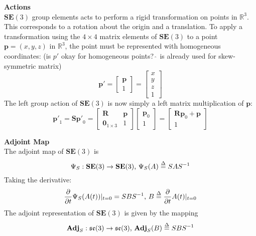 		\textbf{Actions}\\
		$\mathbf{SE}(3)$ group elements acts to perform a rigid transformation on points in $\mathbb{R}^3$. This corresponds to a rotation about the origin and a translation.
		To apply a transformation using the $4 \times 4$ matrix elements of $\mathbf{SE}(3)$ to a point $\textbf{p} = (x,y,z) $ in $\mathbb{R}^3$, the point must be represented with homogeneous coordinates: (is $p'$ okay for homogeneous points? $\hat{\:}$ is already used for skew-symmetric matrix)
		\begin{equation}
			\mathbf{p'} = 
			\begin{bmatrix}
				  \mathbf{p} \\
				  1	
			\end{bmatrix} =
			\begin{bmatrix}
				  x	\\
				  y	\\
				  z	\\
				  1	
			\end{bmatrix}
		\end{equation}
		The left group action of $\mathbf{SE}(3)$ is now simply a left matrix multiplication of $\mathbf{p}$:
		\begin{equation}
			\mathbf{p'}_1 = \mathbf{S}\mathbf{p'}_0 = 
			\begin{bmatrix}
				\mathbf{R}	&	\mathbf{p} \\
				\textbf{0}_{1 \times 3}		& 	1 					 				  
			\end{bmatrix}
			\begin{bmatrix}
				\mathbf{p}_0 \\
				1	
			\end{bmatrix}
			=
			\begin{bmatrix}
				\mathbf{R}\mathbf{p}_0 + \mathbf{p}\\
				1	
			\end{bmatrix}
		\end{equation}
				
		\textbf{Adjoint Map}\\
		The adjoint map of $\mathbf{SE}(3)$ is
		\begin{equation}
			\Psi_S: \mathbf{SE}(3) \rightarrow \mathbf{SE}(3) \textnormal{, }
			\Psi_S(A) \stackrel{\Delta}{=} SAS^{-1}
		\end{equation}
		Taking the derivative:
		\begin{equation}
			\frac{\partial}{\partial t} \Psi_S(A(t))|_{t=0} = SBS^{-1} \textnormal{, }
			B \stackrel{\Delta}{=} 	\frac{\partial}{\partial t}A(t)|_{t=0}
		\end{equation}
		The adjoint	representation of $\mathbf{SE}(3)$ is given by the mapping
		\begin{equation}
			\textbf{Adj}_S: \mathfrak{se}(3) \rightarrow \mathfrak{se}(3) \textnormal{, }
			\textbf{Adj}_S(B) \stackrel{\Delta}{=} SBS^{-1}
		\end{equation}
		
